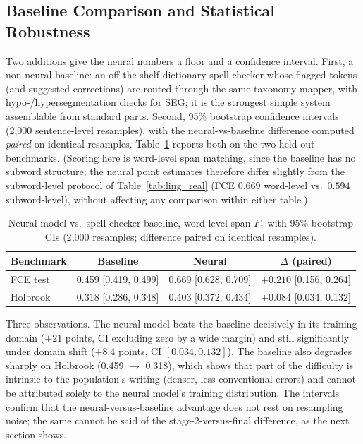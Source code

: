 \subsection{Baseline Comparison and Statistical Robustness}
\label{sec:eval_ling_baseline}

Two additions give the neural numbers a floor and a confidence interval. First, a non-neural baseline: an off-the-shelf dictionary spell-checker whose flagged tokens (and suggested corrections) are routed through the same taxonomy mapper, with hypo-/hypersegmentation checks for SEG; it is the strongest simple system assemblable from standard parts. Second, 95\% bootstrap confidence intervals (2{,}000 sentence-level resamples), with the neural-vs-baseline difference computed \emph{paired} on identical resamples. Table~\ref{tab:ling_baseline_ci} reports both on the two held-out benchmarks. (Scoring here is word-level span matching, since the baseline has no subword structure; the neural point estimates therefore differ slightly from the subword-level protocol of Table~\ref{tab:ling_real} (FCE $0.669$ word-level vs.\ $0.594$ subword-level), without affecting any comparison within either table.)

\begin{table}[h]
\centering
\caption[Neural model vs.\ spell-checker baseline, word-level span $F_1$ with 95\% bootstrap CIs.]{Neural model vs.\ spell-checker baseline, word-level span $F_1$ with 95\% bootstrap CIs (2{,}000 resamples; difference paired on identical resamples).}
\label{tab:ling_baseline_ci}
\begin{tabular}{lccc}
\toprule
\textbf{Benchmark} & \textbf{Baseline} & \textbf{Neural} & \textbf{$\Delta$ (paired)} \\
\midrule
FCE test & 0.459 [0.419, 0.499] & 0.669 [0.628, 0.709] & $+0.210$ [0.156, 0.264] \\
Holbrook & 0.318 [0.286, 0.348] & 0.403 [0.372, 0.434] & $+0.084$ [0.034, 0.132] \\
\bottomrule
\end{tabular}
\end{table}

Three observations. The neural model beats the baseline decisively in its training domain ($+21$ points, CI excluding zero by a wide margin) and still significantly under domain shift ($+8.4$ points, CI $[0.034, 0.132]$). The baseline also degrades sharply on Holbrook (0.459 $\rightarrow$ 0.318), which shows that part of the difficulty is intrinsic to the population's writing (denser, less conventional errors) and cannot be attributed solely to the neural model's training distribution. The intervals confirm that the neural-versus-baseline advantage does not rest on resampling noise; the same cannot be said of the stage-2-versus-final difference, as the next section shows.

